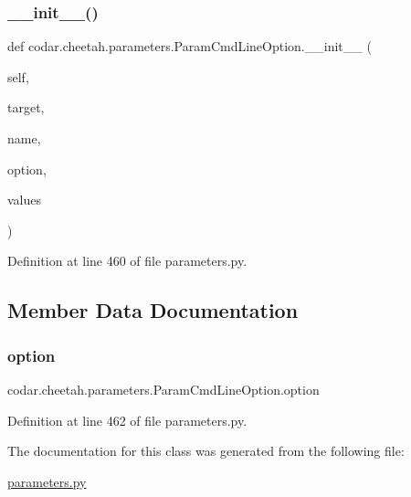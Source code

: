\subsubsection{\texorpdfstring{\+\_\+\+\_\+init\+\_\+\+\_\+()}{\_\_init\_\_()}}
{\footnotesize\ttfamily def codar.\+cheetah.\+parameters.\+Param\+Cmd\+Line\+Option.\+\_\+\+\_\+init\+\_\+\+\_\+ (\begin{DoxyParamCaption}\item[{}]{self,  }\item[{}]{target,  }\item[{}]{name,  }\item[{}]{option,  }\item[{}]{values }\end{DoxyParamCaption})}



Definition at line 460 of file parameters.\+py.



\subsection{Member Data Documentation}
\mbox{\label{classcodar_1_1cheetah_1_1parameters_1_1_param_cmd_line_option_a75dae9b35fe11bc6833cfa0777185e20}} 
\subsubsection{\texorpdfstring{option}{option}}
{\footnotesize\ttfamily codar.\+cheetah.\+parameters.\+Param\+Cmd\+Line\+Option.\+option}



Definition at line 462 of file parameters.\+py.



The documentation for this class was generated from the following file\+:\begin{DoxyCompactItemize}
\item 
\hyperlink{parameters_8py}{parameters.\+py}\end{DoxyCompactItemize}

